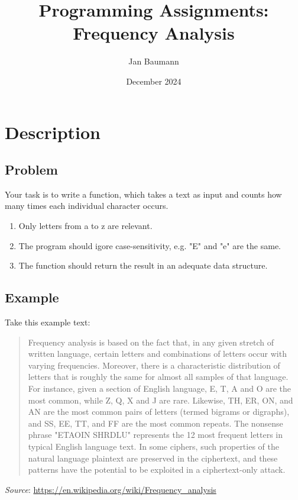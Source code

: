 \documentclass{article}
\author{Jan Baumann}
\date{December 2024}
\title{Programming Assignments: Frequency Analysis}
\begin{document}
\maketitle

\section{Description}
\subsection{Problem}
Your task is to write a function, which takes a text as input and counts how many times each individual character occurs.

\begin{enumerate}
    \item Only letters from a to z are relevant.
    \item The program should igore case-sensitivity, e.g. "E" and "e" are the same.
    \item The function should return the result in an adequate data structure.
\end{enumerate}

\subsection{Example}

Take this example text:

\begin{quote}
    Frequency analysis is based on the fact that, in any given stretch of written language, certain letters and combinations 
of letters occur with varying frequencies. Moreover, there is a characteristic distribution of 
letters that is roughly the same for almost all samples of that language. For instance, given a section of English language, 
E, T, A and O are the most common, while Z, Q, X and J are rare. Likewise, TH, ER, ON, and AN are the most common pairs of letters 
(termed bigrams or digraphs), and SS, EE, TT, and FF are the most common repeats. The nonsense phrase "ETAOIN SHRDLU" represents 
the 12 most frequent letters in typical English language text. In some ciphers, such properties of the natural language plaintext are 
preserved in the ciphertext, and these patterns have the potential to be exploited in a ciphertext-only attack.
\end{quote}

\textit{Source}: \url{https://en.wikipedia.org/wiki/Frequency_analysis} \\
\end{document}
